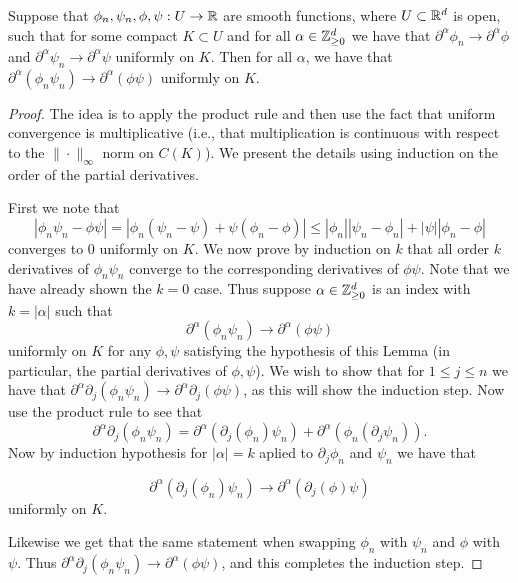 \documentclass[twoside, a4paper, 10pt]{amsart}
\begin{document}
\begin{lemma} Suppose that $\phi_n, \psi_n, \phi, \psi:U \to \mathbb{R}$ are smooth functions, where $U \subset \mathbb{R}^d$ is open, such that for some compact $K \subset U$ and for all $\alpha \in \mathbb{Z}^d_{\geq 0}$ we have that $\partial^{\alpha} \phi_n \to \partial^{\alpha}\phi$ and $\partial^{\alpha} \psi_n \to \partial^{\alpha}\psi$ uniformly on $K$. Then for all $\alpha$, we have that $\partial^{\alpha} (\phi_n \psi_n) \to \partial^{\alpha} (\phi \psi)$ uniformly on $K$.

\end{lemma}

\begin{proof} The idea is to apply the product rule and then use the fact that uniform convergence is multiplicative (i.e., that multiplication is continuous with respect to the $\| \cdot \|_{\infty}$ norm on $C(K)$). We present the details using induction on the order of the partial derivatives. 

First we note that $$|\phi_n \psi_n - \phi \psi| = |\phi_n (\psi_n - \psi) + \psi (\phi_n - \phi)| \leq |\phi_n||\psi_n - \phi_n| + |\psi||\phi_n - \phi|$$ converges to $0$ uniformly on $K$. We now prove by induction on $k$ that all order $k$ derivatives of $\phi_n \psi_n$ converge to the corresponding derivatives of $\phi \psi$. Note that we have already shown the $k=0$ case. Thus suppose $\alpha \in \mathbb{Z}^d_{\geq 0}$ is an index with $k = |\alpha|$ such that $$\partial^{\alpha} (\phi_n \psi_n) \to \partial^{\alpha} (\phi \psi)$$ uniformly on $K$ for any $\phi,\psi$ satisfying the hypothesis of this Lemma (in particular, the partial derivatives of $\phi,\psi$). We wish to show that for $1\leq j \leq n$ we have that $\partial^{\alpha}\partial_j (\phi_n\psi_n) \to \partial^{\alpha}\partial_j(\phi \psi)$, as this will show the induction step. Now use the product rule to see that $$\partial^{\alpha}\partial_j (\phi_n \psi_n) = \partial^{\alpha}(\partial_j(\phi_n) \psi_n) + \partial^{\alpha}(\phi_n (\partial_j \psi_n)).$$ Now by induction hypothesis for $|\alpha| = k$ aplied to $\partial_j\phi_n$ and $\psi_n$ we have that

$$\partial^{\alpha} \left(\partial_j(\phi_n) \psi_n \right) \to \partial^{\alpha} \left( \partial_j(\phi) \psi \right) $$ uniformly on $K$. 

Likewise we get that the same statement when swapping $\phi_n$ with $\psi_n$ and $\phi$ with $\psi$. Thus $\partial^{\alpha} \partial_j (\phi_n \psi_n) \to \partial^{\alpha} (\phi \psi)$, and this completes the induction step. \end{proof}
\end{document}
